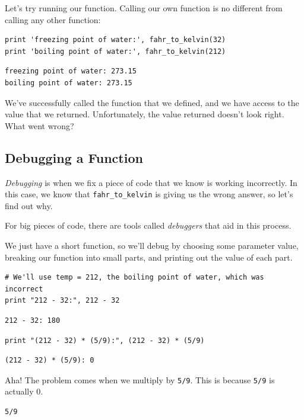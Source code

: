 \documentclass[]{book}
\begin{document}
Let's try running our function. Calling our own function is no different
from calling any other function:

\begin{verbatim}
print 'freezing point of water:', fahr_to_kelvin(32)
print 'boiling point of water:', fahr_to_kelvin(212)
\end{verbatim}

\begin{verbatim}
freezing point of water: 273.15
boiling point of water: 273.15
\end{verbatim}

We've successfully called the function that we defined, and we have
access to the value that we returned. Unfortunately, the value returned
doesn't look right. What went wrong?

\subsection{Debugging a Function}

\emph{Debugging} is when we fix a piece of code that we know is working
incorrectly. In this case, we know that \texttt{fahr\_to\_kelvin} is
giving us the wrong answer, so let's find out why.

For big pieces of code, there are tools called \emph{debuggers} that aid
in this process.

We just have a short function, so we'll debug by choosing some parameter
value, breaking our function into small parts, and printing out the
value of each part.

\begin{verbatim}
# We'll use temp = 212, the boiling point of water, which was incorrect
print "212 - 32:", 212 - 32
\end{verbatim}

\begin{verbatim}
212 - 32: 180
\end{verbatim}

\begin{verbatim}
print "(212 - 32) * (5/9):", (212 - 32) * (5/9)
\end{verbatim}

\begin{verbatim}
(212 - 32) * (5/9): 0
\end{verbatim}

Aha! The problem comes when we multiply by \texttt{5/9}. This is because
\texttt{5/9} is actually 0.

\begin{verbatim}
5/9
\end{verbatim}
\end{document}
